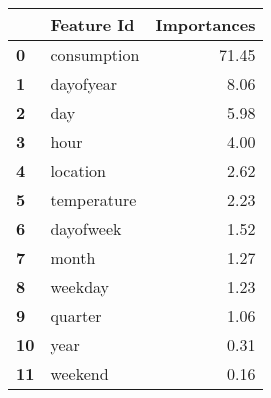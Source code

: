 \begin{tabular}{llr}
\toprule
{} &   Feature Id &  Importances \\
\midrule
\textbf{0 } &  consumption &        71.45 \\
\textbf{1 } &    dayofyear &         8.06 \\
\textbf{2 } &          day &         5.98 \\
\textbf{3 } &         hour &         4.00 \\
\textbf{4 } &     location &         2.62 \\
\textbf{5 } &  temperature &         2.23 \\
\textbf{6 } &    dayofweek &         1.52 \\
\textbf{7 } &        month &         1.27 \\
\textbf{8 } &      weekday &         1.23 \\
\textbf{9 } &      quarter &         1.06 \\
\textbf{10} &         year &         0.31 \\
\textbf{11} &      weekend &         0.16 \\
\bottomrule
\end{tabular}
